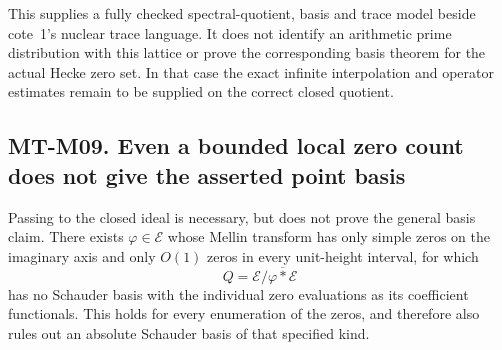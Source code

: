 \documentclass[11pt,a4paper]{article}
\begin{document}
This supplies a fully checked spectral-quotient, basis and trace
model beside cote~1's nuclear trace language. It does not identify
an arithmetic prime distribution with this lattice or prove the
corresponding basis theorem for the actual Hecke zero set. In that
case the exact infinite interpolation and operator estimates remain
to be supplied on the correct closed quotient.

\subsection*{MT-M09. Even a bounded local zero count does not give the asserted point basis}
Passing to the closed ideal is necessary, but does not prove the
general basis claim. There exists $\varphi\in\mathcal E$ whose Mellin
transform has only simple zeros on the imaginary axis and only
$O(1)$ zeros in every unit-height interval, for which
\[
        Q=\mathcal E/\overline{\varphi*\mathcal E}
\]
has no Schauder basis with the individual zero evaluations as its
coefficient functionals. This holds for every enumeration of the
zeros, and therefore also rules out an absolute Schauder basis of
that specified kind.
\end{document}

